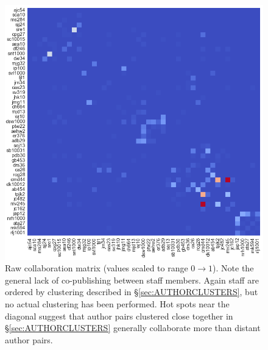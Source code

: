 \begin{figure}[H]
  \centering
    \includegraphics[width=\textwidth]{Analysis/raw_collabs.png}
    \caption{Raw collaboration matrix (values scaled to range $0 \rightarrow 1$). Note the general lack of co-publishing between staff members. Again staff are ordered by clustering described in \S\ref{sec:AUTHORCLUSTERS}, but no actual clustering has been performed. Hot spots near the diagonal suggest that author pairs clustered close together in \S\ref{sec:AUTHORCLUSTERS} generally collaborate more than distant author pairs.}
      \label{fig:rawcollabs}
  \end{figure}
